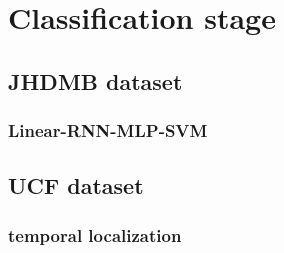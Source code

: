 \documentclass{report}
\begin{document}
 
\chapter{Classification stage}


\section{JHDMB dataset}
\subsection{Linear-RNN-MLP-SVM}

\section{UCF dataset}
\subsection{temporal localization}
\end{document}
